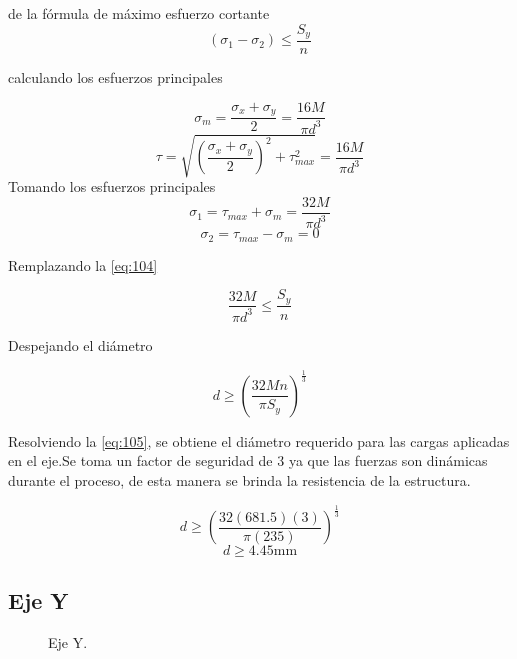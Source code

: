 de la fórmula de máximo esfuerzo cortante
\begin{equation}
(\sigma_1-\sigma_2)\leq \frac{S_y}{n}   
\label{eq:104}
\end{equation}


calculando los esfuerzos principales

\[\sigma_m=\frac{\sigma_x+\sigma_y}{2}=\frac{16M}{\pi d^3}\]
\[\tau=\sqrt{(\frac{\sigma_x+\sigma_y}{2})^2+\tau_{max}^2}=\frac{16M}{\pi d^3}\]
Tomando los esfuerzos principales
\[\sigma_1=\tau_{max}+\sigma_m=\frac{32M}{\pi d^3}\]
\[\sigma_2=\tau_{max}-\sigma_m=0\]

Remplazando la \autoref{eq:104}

\[\frac{32M}{\pi d^3}\leq \frac{S_y}{n}\]

Despejando el diámetro

\begin{equation}
  d\geq (\frac{32Mn}{\pi S_y})^{\frac{1}{3}} 
  \label{eq:105}
\end{equation}

Resolviendo la \autoref{eq:105}, se obtiene el diámetro requerido para las cargas aplicadas en el eje.Se toma un factor de seguridad de 3 ya que las fuerzas son dinámicas durante el proceso, de esta manera se brinda la resistencia de la estructura.

\[d\geq (\frac{32(681.5)(3)}{\pi(235)})^{\frac{1}{3}} \]
\[d\geq 4.45\text{mm}\]


\subsection{Eje Y}


\begin{figure}[H]
    \centering
    \caption{Eje Y.}
    \label{fig:Y}
\end{figure}



